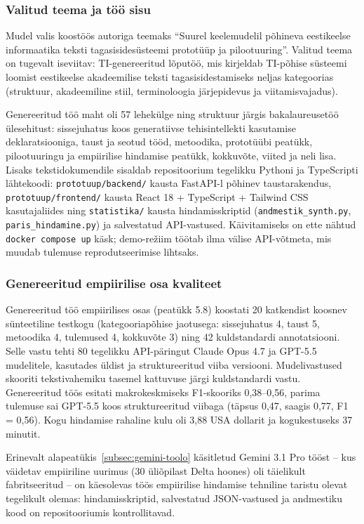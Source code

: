 \subsubsection{Valitud teema ja töö sisu}

Mudel valis koostöös autoriga teemaks ``Suurel keelemudelil põhineva eestikeelse informaatika teksti tagasisidesüsteemi prototüüp ja pilootuuring''. Valitud teema on tugevalt iseviitav: TI-genereeritud lõputöö, mis kirjeldab TI-põhise süsteemi loomist eestikeelse akadeemilise teksti tagasisidestamiseks neljas kategoorias (struktuur, akadeemiline stiil, terminoloogia järjepidevus ja viitamisvajadus).

Genereeritud töö maht oli 57 lehekülge ning struktuur järgis bakalaureusetöö ülesehitust: sissejuhatus koos generatiivse tehisintellekti kasutamise deklaratsiooniga, taust ja seotud tööd, metoodika, prototüübi peatükk, pilootuuringu ja empiirilise hindamise peatükk, kokkuvõte, viited ja neli lisa. Lisaks tekstidokumendile sisaldab repositoorium tegelikku Pythoni ja TypeScripti lähtekoodi: \texttt{prototuup/backend/} kausta FastAPI-l põhinev taustarakendus, \texttt{prototuup/frontend/} kausta React 18 + TypeScript + Tailwind CSS kasutajaliides ning \texttt{statistika/} kausta hindamisskriptid (\texttt{andmestik\_synth.py}, \texttt{paris\_hindamine.py}) ja salvestatud API-vastused. Käivitamiseks on ette nähtud \texttt{docker compose up} käsk; demo-režiim töötab ilma välise API-võtmeta, mis muudab tulemuse reprodutseerimise lihtsaks.

\subsubsection{Genereeritud empiirilise osa kvaliteet}

Genereeritud töö empiirilises osas (peatükk 5.8) koostati 20 katkendist koosnev sünteetiline testkogu (kategooriapõhise jaotusega: sissejuhatus 4, taust 5, metoodika 4, tulemused 4, kokkuvõte 3) ning 42 kuldstandardi annotatsiooni. Selle vastu tehti 80 tegelikku API-päringut Claude Opus 4.7 ja GPT-5.5 mudelitele, kasutades üldist ja struktureeritud viiba versiooni. Mudelivastused skooriti tekstivahemiku tasemel kattuvuse järgi kuldstandardi vastu. Genereeritud töös esitati makrokeskmiseks F1-skooriks 0,38--0,56, parima tulemuse sai GPT-5.5 koos struktureeritud viibaga (täpsus 0,47, saagis 0,77, F1 = 0,56). Kogu hindamise rahaline kulu oli 3,88 USA dollarit ja kogukestuseks 37 minutit.

Erinevalt alapeatükis~\ref{subsec:gemini-toolo} käsitletud Gemini 3.1 Pro tööst -- kus väidetav empiiriline uurimus (30 üliõpilast Delta hoones) oli täielikult fabritseeritud -- on käesolevas töös empiirilise hindamise tehniline taristu olevat tegelikult olemas: hindamisskriptid, salvestatud JSON-vastused ja andmestiku kood on repositooriumis kontrollitavad.

